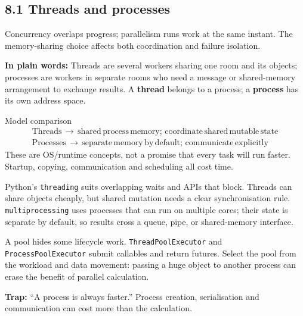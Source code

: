 \documentclass[11pt]{article}
\begin{document}
\begin{keepsection}
\section{8.1 Threads and processes}

Concurrency overlaps progress; parallelism runs work at the same instant. The memory-sharing choice affects both coordination and failure isolation.

\begin{plainbox}\textbf{In plain words:} Threads are several workers sharing one room and its objects; processes are workers in separate rooms who need a message or shared-memory arrangement to exchange results. A \textbf{thread} belongs to a process; a \textbf{process} has its own address space.\end{plainbox}

\begin{equationcard}{Model comparison}
\[ \begin{gathered} \text{Threads}\, \to \, \text{shared}\, \text{process}\, \text{memory};\, \text{coordinate}\, \text{shared}\, \text{mutable}\, \text{state} \\ \text{Processes}\, \to \, \text{separate}\, \text{memory}\, \text{by}\, \text{default};\, \text{communicate}\, \text{explicitly} \end{gathered} \]
{\small These are OS/runtime concepts, not a promise that every task will run faster. Startup, copying, communication and scheduling all cost time.}
\end{equationcard}

Python’s \texttt{threading} suits overlapping waits and APIs that block. Threads can share objects cheaply, but shared mutation needs a clear synchronisation rule. \texttt{multiprocessing} uses processes that can run on multiple cores; their state is separate by default, so results cross a queue, pipe, or shared-memory interface.

A pool hides some lifecycle work. \texttt{ThreadPoolExecutor} and \texttt{ProcessPoolExecutor} submit callables and return futures. Select the pool from the workload and data movement: passing a huge object to another process can erase the benefit of parallel calculation.

\begin{notebox}\textbf{Trap:} “A process is always faster.” Process creation, serialisation and communication can cost more than the calculation.\end{notebox}


\end{keepsection}
\end{document}
